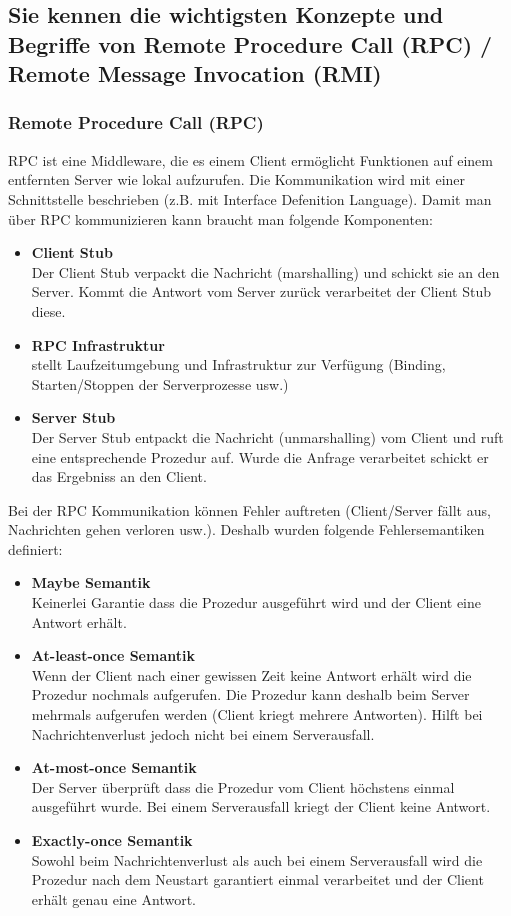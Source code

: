 \subsection{Sie kennen die wichtigsten Konzepte und Begriffe von Remote Procedure Call (RPC) / Remote Message Invocation (RMI)}

\subsubsection{Remote Procedure Call (RPC)}

RPC ist eine Middleware, die es einem Client ermöglicht Funktionen auf einem entfernten Server wie lokal aufzurufen. Die Kommunikation wird mit einer Schnittstelle beschrieben (z.B. mit Interface Defenition Language). Damit man über RPC kommunizieren kann braucht man folgende Komponenten:
\begin{itemize}
	\item \textbf{Client Stub} \\
	Der Client Stub verpackt die Nachricht (marshalling) und schickt sie an den Server. Kommt die Antwort vom Server zurück verarbeitet der Client Stub diese.
	\item \textbf{RPC Infrastruktur} \\
	stellt Laufzeitumgebung und Infrastruktur zur Verfügung (Binding, Starten/Stoppen der Serverprozesse usw.)
	\item \textbf{Server Stub} \\
	Der Server Stub entpackt die Nachricht (unmarshalling) vom Client und ruft eine entsprechende Prozedur auf. Wurde die Anfrage verarbeitet schickt er das Ergebniss an den Client.
\end{itemize}  
Bei der RPC Kommunikation können Fehler auftreten (Client/Server fällt aus, Nachrichten gehen verloren usw.). Deshalb wurden folgende Fehlersemantiken definiert:

\begin{itemize}
	\item \textbf{Maybe Semantik} \\
	Keinerlei Garantie dass die Prozedur ausgeführt wird und der Client eine Antwort erhält.
	\item \textbf{At-least-once Semantik} \\
	Wenn der Client nach einer gewissen Zeit keine Antwort erhält wird die Prozedur nochmals aufgerufen. Die Prozedur kann deshalb beim Server mehrmals aufgerufen werden (Client kriegt mehrere Antworten). Hilft bei Nachrichtenverlust jedoch nicht bei einem Serverausfall.
	\item \textbf{At-most-once Semantik} \\
	Der Server überprüft dass die Prozedur vom Client höchstens einmal ausgeführt wurde. Bei einem Serverausfall kriegt der Client keine Antwort.
	\item \textbf{Exactly-once Semantik} \\
	Sowohl beim Nachrichtenverlust als auch bei einem Serverausfall wird die Prozedur nach dem Neustart garantiert einmal verarbeitet und der Client erhält genau eine Antwort.
\end{itemize}

